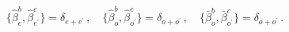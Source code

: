 \begin{equation}
\{\hat{\beta}_{e}^{b},\hat{\beta}_{e^{\prime }}^{c}\}=\delta _{e+e^{\prime
}}\,,\quad \{\hat{\beta}_{o}^{b},\hat{\beta}_{o^{\prime }}^{c}\}=\delta
_{o+o^{\prime }}\,,\quad \{\bar{\beta}_{o}^{b},\bar{\beta}_{o^{\prime
}}^{c}\}=\delta _{o+o^{\prime }}\,.
\end{equation}

